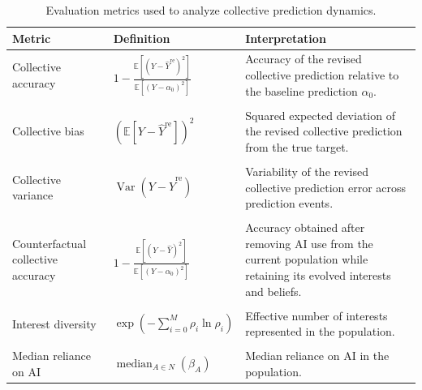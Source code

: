 \documentclass[12pt]{article}
\begin{document}
\begin{table}[!h]
\centering
\caption{Evaluation metrics used to analyze collective prediction dynamics.}
\label{tab:evaluation_metrics}
\renewcommand{\arraystretch}{1}
\begin{tabular}{@{}p{}p{}p{}@{}}
\hline
Metric & Definition & Interpretation \\
\hline

Collective accuracy &
\(\displaystyle 1-\frac{\mathbb{E}[(Y-\hat{Y}^{\mathrm{re}})^2]}{\mathbb{E}[(Y-\alpha_0)^2]}\) &
Accuracy of the revised collective prediction relative to the baseline prediction $\alpha_0$. \\
\\

Collective bias &
\(\displaystyle \left(\mathbb{E}[Y-\hat{Y}^{\mathrm{re}}]\right)^2\) &
Squared expected deviation of the revised collective prediction from the true target. \\
\\

Collective variance &
\(\displaystyle \operatorname{Var}(Y-\hat{Y}^{\mathrm{re}})\) &
Variability of the revised collective prediction error across prediction events. \\
\\

Counterfactual collective accuracy &
\(\displaystyle 1-\frac{\mathbb{E}[(Y-\hat{Y})^2]}{\mathbb{E}[(Y-\alpha_0)^2]}\) &
Accuracy obtained after removing AI use from the current population while retaining its evolved interests and beliefs. \\
\\

Interest diversity &
\(\displaystyle \exp\left(-\sum_{i=0}^{M}\rho_i\ln\rho_i\right)\) &
Effective number of interests represented in the population. \\
\\

Median reliance on AI &
\(\displaystyle \operatorname{median}_{A\in N}(\beta_A)\) &
Median reliance on AI in the population. \\

\hline
\end{tabular}
\end{table}


\pagebreak


\end{document}
